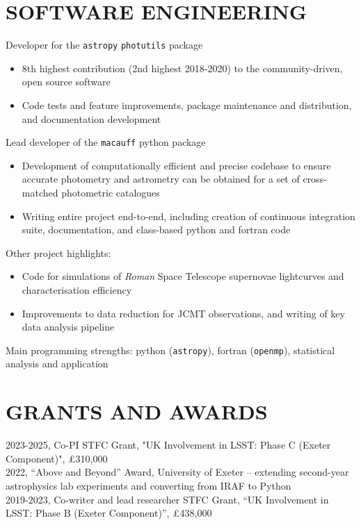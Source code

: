 \documentclass[letter, margin, 10pt]{res} %
\begin{document}
\begin{resume}
\section{SOFTWARE ENGINEERING}

Developer for the \texttt{astropy} \texttt{photutils} package
\begin{itemize}[noitemsep,topsep=0pt,parsep=0pt,partopsep=0pt]
\item 8th highest contribution (2nd highest 2018-2020) to the community-driven, open source software
\item Code tests and feature improvements, package maintenance and distribution, and documentation development
\end{itemize}
\vspace{-10pt}
Lead developer of the \texttt{macauff} python package
\begin{itemize}[noitemsep,topsep=0pt,parsep=0pt,partopsep=0pt]
\item Development of computationally efficient and precise codebase to ensure accurate photometry and astrometry can be obtained for a set of cross-matched photometric catalogues
\item Writing entire project end-to-end, including creation of continuous integration suite, documentation, and class-based python and fortran code
\end{itemize}
\vspace{-10pt}
Other project highlights:
\begin{itemize}[noitemsep,topsep=0pt,parsep=0pt,partopsep=0pt]
\item Code for simulations of \textit{Roman} Space Telescope supernovae lightcurves and characterisation efficiency
\item Improvements to data reduction for JCMT observations, and writing of key data analysis pipeline
\end{itemize}
\vspace{-10pt}
Main programming strengths: python (\texttt{astropy}), fortran (\texttt{openmp}), statistical analysis and application

\parskip 5pt
\vspace{-6pt}
\section{GRANTS AND AWARDS}
2023-2025, Co-PI STFC Grant, "UK Involvement in LSST: Phase C (Exeter Component)", £310,000\\
2022, ``Above and Beyond'' Award, University of Exeter -- extending second-year astrophysics lab experiments and converting from IRAF to Python\\
2019-2023, Co-writer and lead researcher STFC Grant, ``UK Involvement in LSST: Phase B (Exeter Component)'', £438,000


\end{resume}
\end{document}

